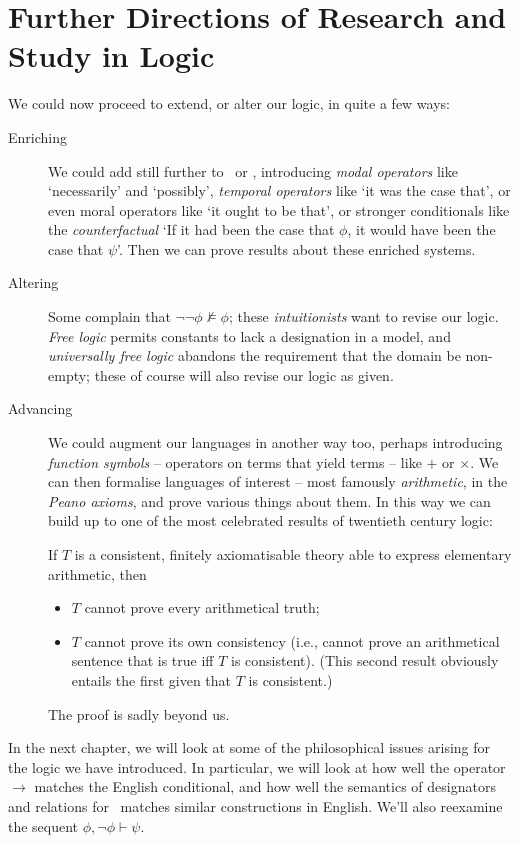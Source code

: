 \section{Further Directions of Research and Study in Logic}

We could now proceed to extend, or alter our logic, in quite a few ways:
\begin{description}
	\item [Enriching] We could add still further to \lequ\ or \lone, introducing \emph{modal operators} like `necessarily' and `possibly', \emph{temporal operators} like `it was the case that', or even moral operators like `it ought to be that', or stronger conditionals like the \emph{counterfactual} `If it had been the case that $\phi$, it would have been the case that $\psi$'. Then we can prove results about these enriched systems.
	\item [Altering]  Some complain that $\neg\neg \phi \not \vDash \phi$; these \emph{intuitionists} want to revise our logic. \emph{Free logic} permits constants to lack a designation in a model, and \emph{universally free logic} abandons the requirement that the domain be non-empty; these of course will also revise our logic as given.
	\item [Advancing] We could augment our languages in another way too, perhaps introducing \emph{function symbols} – operators on terms that yield terms – like $+$ or $\times$. We can then formalise languages of interest – most famously \emph{arithmetic}, in the \emph{Peano axioms}, and prove various things about them. In this way we can build up to one of the most celebrated results of twentieth century logic: \begin{theorem}
	If $T$ is a consistent, finitely axiomatisable theory able to express elementary arithmetic, then \begin{itemize}
		\item $T$ cannot prove every arithmetical truth;
		\item $T$ cannot prove its own consistency (i.e., cannot prove an arithmetical sentence that is true iff $T$ is consistent). (This second result obviously entails the first given that $T$ is consistent.)
	\end{itemize}
\end{theorem}
The proof is sadly beyond us. 
\end{description}

In the next chapter, we will look at some of the philosophical issues arising for the logic we have introduced. In particular, we will look at how well the operator $\to$ matches the English conditional, and how well the semantics of designators and relations for \ltwo\ matches  similar constructions in English. We'll also reexamine the sequent $\phi,\neg\phi\vdash\psi$.

